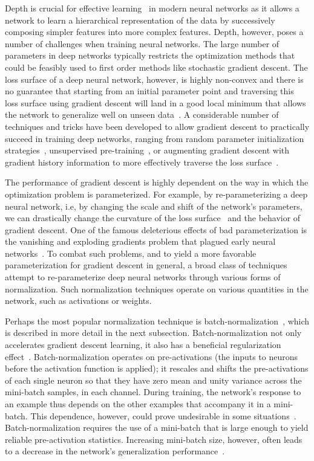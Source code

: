 \documentclass[conference]{IEEEtran}
\begin{document}
Depth is crucial for effective learning~\cite{Ba_Caruna14} in  modern neural networks as it allows a network to learn a hierarchical representation of the data by successively composing simpler features into more complex features. Depth, however, poses a number of challenges when training neural networks. The large number of parameters in deep networks typically restricts the optimization methods that could be feasibly used to first order methods like stochastic gradient descent. The loss surface of a deep neural network, however, is highly non-convex and there is no guarantee that starting from an initial parameter point and traversing this loss surface using gradient descent will land in a good local minimum that allows the network to generalize well on unseen data~\cite{Choromanska_etal15,Zhang_etal16a}. A considerable number of techniques and tricks have been developed to allow gradient descent to practically succeed in training deep networks, ranging from random parameter initialization strategies~\cite{Glorot_Bengio10,He.15}, unsupervised pre-training~\cite{Erhan_etal10,Lee_etal09,Ranzato_etal07}, or augmenting gradient descent with gradient history information to more effectively traverse the loss surface~\cite{Kingma_Ba14,Zeiler12}.

The performance of gradient descent is highly dependent on the way in which the optimization problem is parameterized. For example, by re-parameterizing a deep neural network, i.e, by changing the scale and shift of the network's parameters, we can drastically change the curvature of the loss surface~\cite{Dinh_etal17} and the behavior of gradient descent. One of the famous deleterious effects of bad parameterization is the vanishing and exploding gradients problem that plagued early neural networks~\cite{Hochreiter_Schmidhuber97}. To combat such problems, and to yield a more favorable parameterization for gradient descent in general, a broad class of techniques attempt to re-parameterize deep neural networks through various forms of normalization. Such normalization techniques operate on various quantities in the network, such as activations or weights.

Perhaps the most popular normalization technique is batch-normalization~\cite{Ioffe.15}, which is described in more detail in the next subsection. Batch-normalization not only accelerates gradient descent learning, it also has a beneficial regularization effect~\cite{Morcos_etal18}. Batch-normalization operates on pre-activations (the inputs to neurons before the activation function is applied); it rescales and shifts the pre-activations of each single neuron so that they have zero mean and unity variance across the mini-batch samples, in each channel. During training, the network's response to an example  thus depends on the other examples that accompany it in a mini-batch. This dependence, however, could prove undesirable in some situations~\cite{Salimans_etal16}. Batch-normalization requires the use of a mini-batch that is large enough to yield reliable pre-activation statistics. Increasing mini-batch size, however, often leads to a decrease in the network's generalization performance~\cite{Keskar_etal16}.
\end{document}
